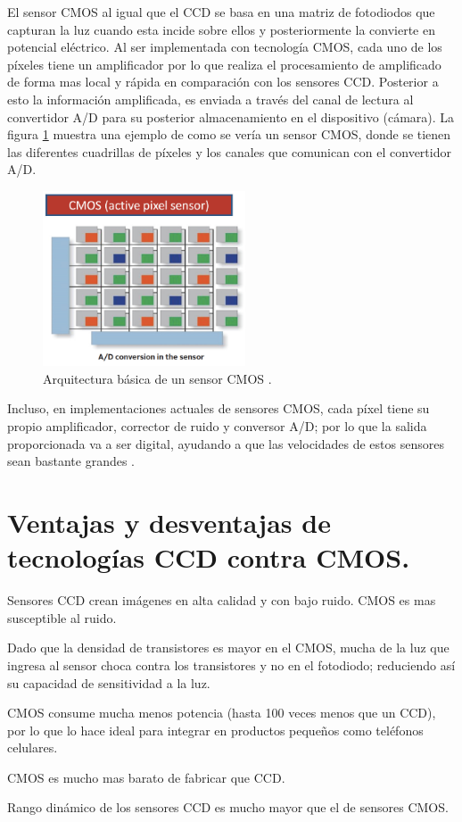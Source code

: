 \documentclass[conference]{IEEEtran}
\begin{document}
El sensor CMOS al igual que el CCD se basa en una matriz de fotodiodos que capturan la luz cuando esta incide sobre ellos y posteriormente la convierte en potencial eléctrico. Al ser implementada con tecnología CMOS, cada uno de los píxeles tiene un amplificador por lo que realiza el procesamiento de amplificado de forma mas local y rápida en comparación con los sensores CCD. Posterior a esto la información amplificada, es enviada a través del canal de lectura al convertidor A/D para su posterior almacenamiento en el dispositivo (cámara). La figura \ref{cmos_sensor} muestra una ejemplo de como se vería un sensor CMOS, donde se tienen las diferentes cuadrillas de píxeles y los canales que comunican con el convertidor A/D.

\begin{figure}[H]
\centering
\includegraphics[width=6cm]{cmos_sensor}
\caption{Arquitectura básica de un sensor CMOS \cite{cmos}.}
\label{cmos_sensor}
\end{figure}

Incluso, en implementaciones actuales de sensores CMOS, cada píxel tiene su propio amplificador, corrector de ruido y conversor A/D; por lo que la salida proporcionada va a ser digital, ayudando a que las velocidades de estos sensores sean bastante grandes \cite{ccd_vs_cmos_1}.

\section{\textbf{Ventajas y desventajas de tecnologías CCD contra CMOS.}}
\begin{list}{--}{}
\item
Sensores CCD crean imágenes en alta calidad y con bajo ruido. CMOS es mas susceptible al ruido.
\item
Dado que la densidad de transistores es mayor en el CMOS, mucha de la luz que ingresa al sensor choca contra los transistores y no en el fotodiodo; reduciendo así su capacidad de sensitividad a la luz.
\item
CMOS consume mucha menos potencia (hasta 100 veces menos que un CCD), por lo que lo hace ideal para integrar en productos peque\~nos como teléfonos celulares.
\item
CMOS es mucho mas barato de fabricar que CCD.
\item
Rango dinámico de los sensores CCD es mucho mayor que el de sensores CMOS. 
\end{list}
\end{document}
